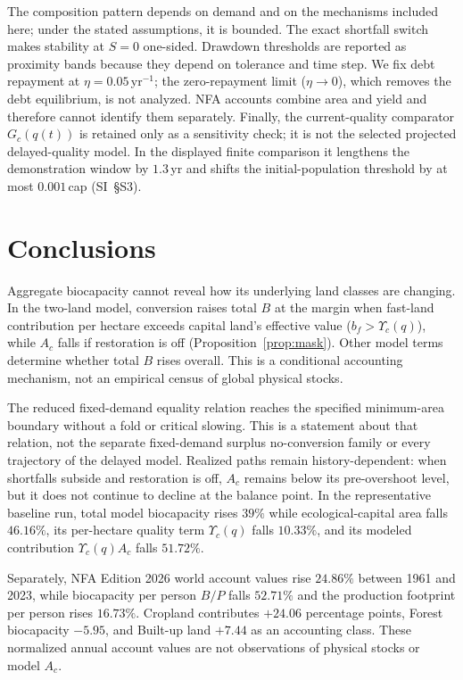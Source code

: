 \documentclass[preprint,12pt,authoryear]{elsarticle}
\newcommand{\Ups}{\Upsilon_c}
\begin{document}
The composition pattern depends on demand and on the mechanisms included here; under the stated assumptions, it is bounded. The exact shortfall switch makes stability at $S=0$ one-sided. Drawdown thresholds are reported as proximity bands because they depend on tolerance and time step. We fix debt repayment at $\eta=0.05$\,yr$^{-1}$; the zero-repayment limit ($\eta\to0$), which removes the debt equilibrium, is not analyzed. NFA accounts combine area and yield and therefore cannot identify them separately. Finally, the current-quality comparator $G_c(q(t))$ is retained only as a sensitivity check; it is not the selected projected delayed-quality model. In the displayed finite comparison it lengthens the demonstration window by $1.3$\,yr and shifts the initial-population threshold by at most $0.001$\,cap (SI~\S S3).

\section{Conclusions}\label{sec:conclusions}

Aggregate biocapacity cannot reveal how its underlying land classes are changing. In the two-land model, conversion raises total $B$ at the margin when fast-land contribution per hectare exceeds capital land's effective value ($b_f>\Ups(q)$), while $A_c$ falls if restoration is off (Proposition~\ref{prop:mask}). Other model terms determine whether total $B$ rises overall. This is a conditional accounting mechanism, not an empirical census of global physical stocks.

The reduced fixed-demand equality relation reaches the specified minimum-area boundary without a fold or critical slowing. This is a statement about that relation, not the separate fixed-demand surplus no-conversion family or every trajectory of the delayed model. Realized paths remain history-dependent: when shortfalls subside and restoration is off, $A_c$ remains below its pre-overshoot level, but it does not continue to decline at the balance point. In the representative baseline run, total model biocapacity rises $39\%$ while ecological-capital area falls $46.16\%$, its per-hectare quality term $\Ups(q)$ falls $10.33\%$, and its modeled contribution $\Ups(q)A_c$ falls $51.72\%$.

Separately, NFA Edition 2026 world account values rise $24.86\%$ between 1961 and 2023, while biocapacity per person $B/P$ falls $52.71\%$ and the production footprint per person rises $16.73\%$. Cropland contributes $+24.06$ percentage points, Forest biocapacity $-5.95$, and Built-up land $+7.44$ as an accounting class. These normalized annual account values are not observations of physical stocks or model $A_c$.
\end{document}
